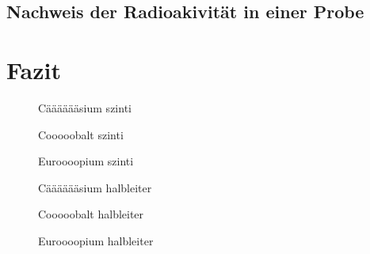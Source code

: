 \documentclass[11pt, a4paper]{article}
\numberwithin{equation}{section}
\begin{document}
\subsection{Nachweis der Radioakivität in einer Probe}

\section{Fazit}

\begin{figure}[h]
	\centering
	
	\caption{Cääääääsium szinti}
	\label{fig:szin_caesium_spektrum}
\end{figure}

\begin{figure}[h]
	\centering
	
	\caption{Cooooobalt szinti}
	\label{fig:szin_cobalt_spektrum}
\end{figure}

\begin{figure}[h]
	\centering
	
	\caption{Euroooopium szinti}
	\label{fig:szin_europium_spektrum}
\end{figure}

\begin{figure}[h]
	\centering
	
	\caption{Cääääääsium halbleiter}
	\label{fig:halb_caesium_spektrum}
\end{figure}

\begin{figure}[h]
	\centering
	
	\caption{Cooooobalt halbleiter}
	\label{fig:halb_cobalt_spektrum}
\end{figure}

\begin{figure}[h]
	\centering
	
	\caption{Euroooopium halbleiter}
	\label{fig:halb_europium_spektrum}
\end{figure}

\begin{figure}
	
\end{figure}

\begin{figure}
	
\end{figure}
\end{document}
